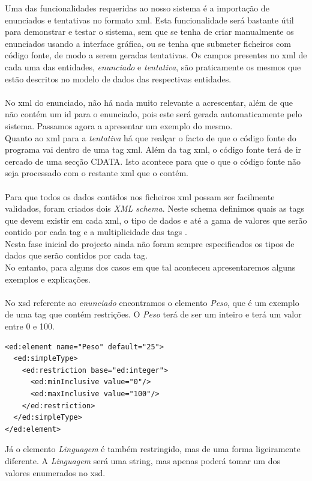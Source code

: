 Uma das funcionalidades requeridas ao nosso sistema é a importação de enunciados e tentativas no formato xml.
Esta funcionalidade será bastante útil para demonstrar e testar o sistema, sem que se tenha de criar manualmente os enunciados
 usando a interface gráfica, ou se tenha que submeter ficheiros com código fonte, de modo a serem geradas tentativas.
Os campos presentes no xml de cada uma das entidades, \textit{enunciado} e \textit{tentativa}, são praticamente os mesmos 
que estão descritos no modelo de dados das respectivas entidades.\\
\\
No xml do enunciado, não há nada muito relevante a acrescentar, além de que não contém um id para o enunciado, pois este será gerada 
automaticamente pelo sistema. Passamos agora a apresentar um exemplo do mesmo.
\\



Quanto ao xml para a \textit{tentativa} há que realçar o facto de que o código fonte do programa vai dentro de uma tag xml.  Além da tag xml, o código fonte
terá de ir cercado de uma secção CDATA. Isto acontece para que o que o código fonte não seja processado com o restante xml que o contém.\\
\\




Para que todos os dados contidos nos ficheiros xml possam ser facilmente validados, foram criados dois \textit{XML schema}.
Neste schema definimos quais as tags que devem existir em cada xml, o tipo de dados e até a gama de valores que serão contido por cada tag e
 a multiplicidade das tags .\\

Nesta fase inicial do projecto ainda não foram sempre especificados  os tipos de dados que serão contidos por cada tag.\\
No entanto, para alguns dos casos em que tal aconteceu apresentaremos alguns exemplos e explicações.\\
\\
No xsd referente ao \textit{enunciado} encontramos o elemento \textit{Peso}, que é um exemplo de uma tag que contém restrições.
O \textit{Peso} terá de ser um inteiro e terá um valor entre 0 e 100.

\begin{lstlisting}
<ed:element name="Peso" default="25">
  <ed:simpleType>
    <ed:restriction base="ed:integer">
      <ed:minInclusive value="0"/>
      <ed:maxInclusive value="100"/>
    </ed:restriction>
  </ed:simpleType>
</ed:element>
\end{lstlisting}
Já o elemento \textit{Linguagem} é também restringido, mas de uma forma ligeiramente diferente. A \textit{Linguagem} será uma string, mas
apenas poderá tomar um dos valores enumerados no xsd.\\

